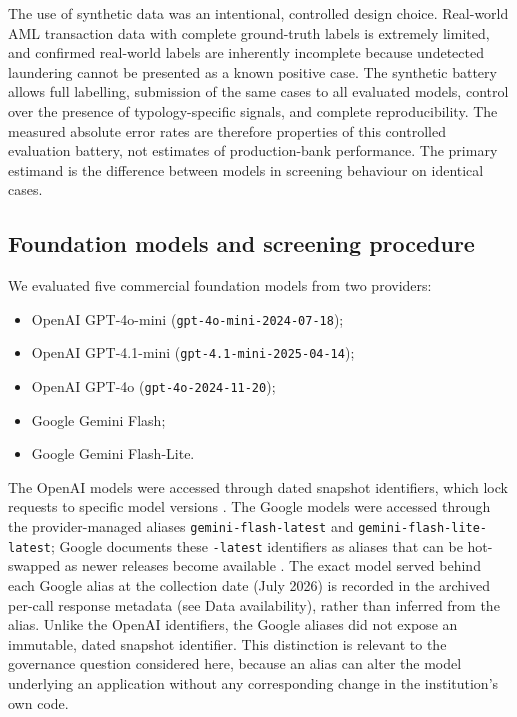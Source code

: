 \documentclass[pdflatex,sn-basic,Numbered]{sn-jnl}
\begin{document}
The use of synthetic data was an intentional, controlled design choice. Real-world AML transaction data with complete ground-truth labels is extremely limited, and confirmed real-world labels are inherently incomplete because undetected laundering cannot be presented as a known positive case. The synthetic battery allows full labelling, submission of the same cases to all evaluated models, control over the presence of typology-specific signals, and complete reproducibility. The measured absolute error rates are therefore properties of this controlled evaluation battery, not estimates of production-bank performance. The primary estimand is the difference between models in screening behaviour on identical cases.

\subsection{Foundation models and screening procedure}

We evaluated five commercial foundation models from two providers:

\begin{itemize}
\item OpenAI GPT-4o-mini (\texttt{gpt-4o-mini-2024-07-18});
\item OpenAI GPT-4.1-mini (\texttt{gpt-4.1-mini-2025-04-14});
\item OpenAI GPT-4o (\texttt{gpt-4o-2024-11-20});
\item Google Gemini Flash;
\item Google Gemini Flash-Lite.
\end{itemize}

The OpenAI models were accessed through dated snapshot identifiers, which lock requests to specific model versions \cite{openai-models}. The Google models were accessed through the provider-managed aliases \texttt{gemini-flash-latest} and \texttt{gemini-flash-lite-latest}; Google documents these \texttt{-latest} identifiers as aliases that can be hot-swapped as newer releases become available \cite{google-models}. The exact model served behind each Google alias at the collection date (July 2026) is recorded in the archived per-call response metadata (see Data availability), rather than inferred from the alias. Unlike the OpenAI identifiers, the Google aliases did not expose an immutable, dated snapshot identifier. This distinction is relevant to the governance question considered here, because an alias can alter the model underlying an application without any corresponding change in the institution's own code.
\end{document}

